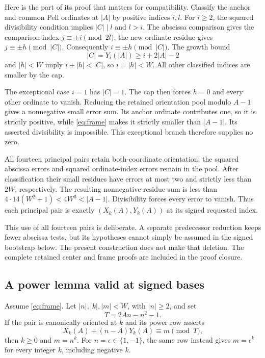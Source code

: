 Here is the part of its proof that matters for compatibility. Classify
the anchor and common Pell ordinates at \(|A|\) by positive indices
\(i,l\). For \(i\ge2\), the squared divisibility condition implies
\(|C|\mid l\) and \(l>i\). The abscissa comparison gives the comparison
index \(j\equiv\pm i\pmod{2l}\); the new ordinate residue gives
\(j\equiv\pm h\pmod{|C|}\). Consequently
\(i\equiv\pm h\pmod{|C|}\). The growth bound
\[
 |C|=Y_i(|A|)\ge i+2|A|-2
\]
and \(|h|<W\) imply \(i+|h|<|C|\), so \(i=|h|<W\).
All other classified indices are smaller by the cap.

The exceptional case \(i=1\) has \(|C|=1\). The cap then forces \(h=0\)
and every other ordinate to vanish. Reducing the retained orientation
pool modulo \(A-1\) gives a nonnegative small error sum. Its anchor
ordinate contributes one, so it is strictly positive, while
\eqref{eq:frame} makes it strictly smaller than \(|A-1|\).
Its asserted divisibility is impossible. This exceptional branch
therefore supplies no zero.

All fourteen principal pairs retain both-coordinate orientation:
the squared abscissa errors and squared ordinate-index errors remain
in the pool. After classification their small residues have errors at
most two and strictly less than \(2W\), respectively. The resulting
nonnegative residue sum is less than
\(4\cdot14(W^2+1)<4W^3<|A-1|\). Divisibility forces every error to vanish.
Thus each principal pair is exactly
\((X_k(A),Y_k(A))\) at its signed requested index.

This use of all fourteen pairs is deliberate. A separate predecessor
reduction keeps fewer abscissa tests, but its hypotheses cannot simply
be assumed in the signed bootstrap below. The present construction
does not make that deletion. The complete retained center and frame
proofs are included in the proof closure.

\subsection{A power lemma valid at signed bases}

\begin{lemma}\label{lem:signed-power}
Assume \eqref{eq:frame}. Let \(|n|,|k|,|m|<W\), with \(|n|\ge2\), and set
\[
 T=2An-n^2-1.
\]
If the pair is canonically oriented at \(k\) and its power row asserts
\[
 X_k(A)+(n-A)Y_k(A)\equiv m\pmod T,
\]
then \(k\ge0\) and \(m=n^k\).
For \(n=\epsilon\in\{1,-1\}\), the same row instead gives
\(m=\epsilon^k\) for every integer \(k\), including negative \(k\).
\end{lemma}

